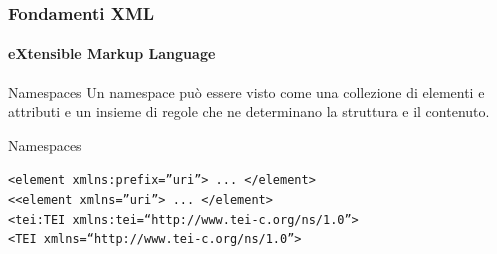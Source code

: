 

\begin{frame}
    \frametitle{Fondamenti XML}
    \framesubtitle{eXtensible Markup Language}
    \addtocounter{nframe}{1}

	\begin{block}{Namespaces}
		Un namespace può essere visto come una collezione di elementi e attributi e un insieme di regole che ne determinano la struttura e il contenuto.
	\end{block}

	\begin{block}{Namespaces}
		\begin{center}
			\texttt{<element xmlns:prefix=”uri”> ... </element>}
			\\\texttt{<<element xmlns=”uri”> ... </element>}
			\\\texttt{<tei:TEI xmlns:tei=``http://www.tei-c.org/ns/1.0''>}
			\\\texttt{<TEI xmlns=``http://www.tei-c.org/ns/1.0''>}
		\end{center}
	\end{block}

\end{frame}







